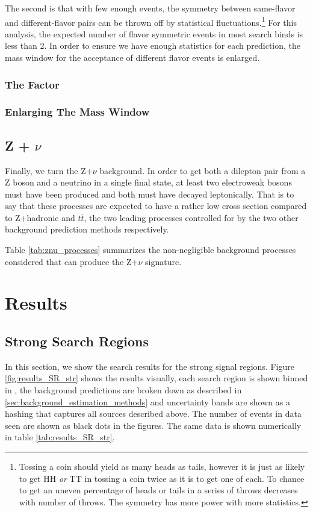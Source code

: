     The second is that with few enough events, the symmetry between same-flavor and different-flavor pairs can be thrown off by statistical fluctuations.\footnote{Tossing a coin should yield as many heads as tails, however it is just as likely to get HH \emph{or} TT in tossing a coin twice as it is to get one of each. To chance to get an uneven percentage of heads or tails in a series of throws decreases with number of throws. The symmetry has more power with more statistics.} For this analysis, the expected number of flavor symmetric events in most search binds is less than 2. In order to ensure we have enough statistics for each prediction, the mass window for the acceptance of different flavor events is enlarged.

    \subsubsection{The \rsfof Factor}

    \subsubsection{Enlarging The Mass Window}

  \subsection{Z + $\nu$} \label{sec:z_+_neutrino}

    Finally, we turn the Z+$\nu$ background. In order to get both a dilepton pair from a Z boson and a neutrino in a single final state, at least two electroweak bosons must have been produced and both must have decayed leptonically. That is to say that these processes are expected to have a rather low cross section compared to Z+hadronic and $t\bar{t}$, the two leading processes controlled for by the two other background prediction methods respectively.

    Table \ref{tab:znu_processes} summarizes the non-negligible background processes considered that can produce the Z+$\nu$ signature.




\section{Results} \label{sec:results}
  \subsection{Strong Search Regions} \label{sec:strong_search_regions}
    In this section, we show the search results for the strong signal regions. Figure \ref{fig:results_SR_str} shows the results visually, each search region is shown binned in \MET, the background predictions are broken down as described in \ref{sec:background_estimation_methods} and uncertainty bands are shown as a hashing that captures all sources described above. The number of events in data seen are shown as black dots in the figures. The same data is shown numerically in table \ref{tab:results_SR_str}.

